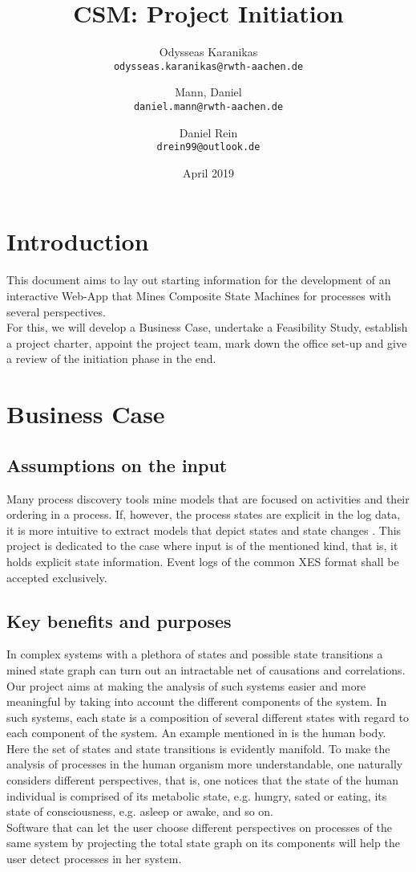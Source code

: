 \documentclass[12pt]{extarticle}
\title{CSM: Project Initiation}
\author{
Odysseas Karanikas\\
\texttt{odysseas.karanikas@rwth-aachen.de}
\and
Mann, Daniel\\
\texttt{daniel.mann@rwth-aachen.de}
\and
Daniel Rein\\
\texttt{drein99@outlook.de}
}
\date{April 2019}
\begin{document}
\maketitle

\section{Introduction}

This document aims to lay out starting information for the development of an interactive Web-App that Mines Composite State Machines for processes with several perspectives.\\
For this, we will develop a Business Case, undertake a Feasibility Study, establish a project charter, appoint the project team, mark down the office set-up and give a review of the initiation phase in the end.

\section{Business Case}

\subsection{Assumptions on the input}

Many process discovery tools mine models that are focused on activities and their ordering in a process. If, however, the process states are explicit in the log data, it is more intuitive to extract models that depict states and state changes \cite{csm-intro}. This project is dedicated to the case where input is of the mentioned kind, that is, it holds explicit state information. Event logs of the common XES format shall be accepted exclusively.\\

\subsection{Key benefits and purposes}

In complex systems with a plethora of states and possible state transitions a mined state graph can turn out an intractable net of causations and correlations. Our project aims at making the analysis of such systems easier and more meaningful by taking into account the different components of the system. In such systems, each state is a composition of several different states with regard to each component of the system. An example mentioned in \cite{csm-intro} is the human body. Here the set of states and state transitions is evidently manifold. To make the analysis of processes in the human organism more understandable, one naturally considers different perspectives, that is, one notices that the state of the human individual is comprised of its metabolic state, e.g. hungry, sated or eating, its state of consciousness, e.g. asleep or awake, and so on.\\
Software that can let the user choose different perspectives on processes of the same system by projecting the total state graph on its components will help the user detect processes in her system.\\
\end{document}
